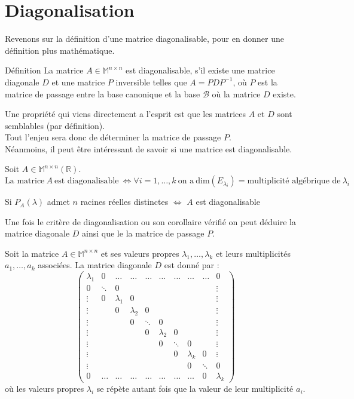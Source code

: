 \section{Diagonalisation}
Revenons sur la définition d'une matrice diagonalisable, pour en donner une définition plus mathématique.
\begin{bclogo}[couleur=blue!30,couleurBord=blue,arrondi=0.1,logo=\bcbook,ombre=true]{Définition}
La matrice $A\in\mathbb{M}^{n\times n}$ est diagonalisable, s'il existe une matrice diagonale $D$ et une matrice $P$ inversible telles que $A=PDP^{-1}$, où $P$ est la matrice de passage entre la base canonique et la base $\mathscr{B}$ où la matrice $D$ existe.
\end{bclogo}
Une propriété qui viens directement a l'esprit est que les matrices $A$ et $D$ sont semblables (par définition).\\
Tout l'enjeu sera donc de déterminer la matrice de passage $P$.\\
Néanmoins, il peut être intéressant de savoir si une matrice est diagonalisable. 
\begin{thm}
Soit $A\in\mathbb{M}^{n\times n}(\mathbb{R})$.
$\text{La matrice}\ A\ \text{est diagonalisable}\ \Leftrightarrow\forall i=1,\hdots,k\ \text{on a}\ \text{dim}(E_{\lambda_i})=\text{multiplicité algébrique de}\ \lambda_i$
\end{thm}
\begin{thm}[Corollaire]
Si $P_A(\lambda)$ admet $n$ racines réelles distinctes $\Leftrightarrow$ $A$ est diagonalisable
\end{thm}
Une fois le critère de diagonalisation ou son corollaire vérifié on peut déduire la matrice diagonale $D$ ainsi que le la matrice de passage $P$.
\begin{prop}
Soit la matrice $A\in\mathbb{M}^{n\times n}$ et ses valeurs propres $\lambda_1,\hdots, \lambda_k$ et leurs multiplicités $a_1,\hdots,a_k$ associées.
La matrice diagonale $D$ est donné par :\\
$$\begin{pmatrix}
\lambda_1 & 0 & \hdots & \hdots & \hdots & \hdots & \hdots & \hdots & \hdots & 0\\
0 & \ddots & 0 & & & & & & & \vdots\\
\vdots & 0 & \lambda_1 & 0 & & & & & & \vdots\\
\vdots & & 0 & \lambda_2 & 0 & & & & & \vdots \\
\vdots & & & 0 & \ddots & 0 & & & & \vdots\\
\vdots & & & & 0 & \lambda_2 & 0 & & & \vdots\\
\vdots & & & & & 0 & \ddots & 0 & & \vdots\\
\vdots & & & & & & 0 & \lambda_k & 0 & \vdots\\
\vdots & & & & & & & 0 & \ddots & 0 \\
0 & \hdots & \hdots & \hdots & \hdots & \hdots & \hdots & \hdots & 0 & \lambda_k
\end{pmatrix}$$
où les valeurs propres $\lambda_i$ se répète autant fois que la valeur de leur multiplicité $a_i$.
\end{prop}

